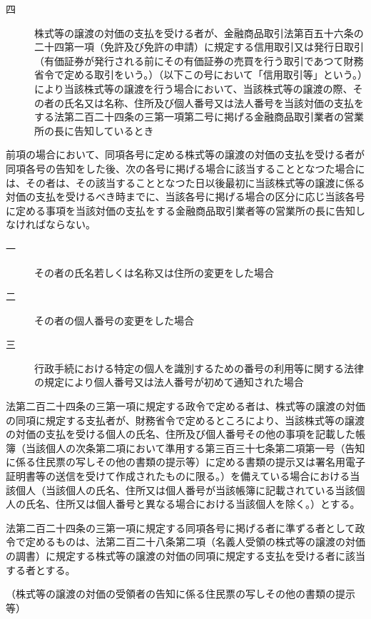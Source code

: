 \documentclass[twocolumn,a4j,10pt]{ltjtarticle}
\begin{document}
\begin{description}
\begin{description}
\item[四]株式等の譲渡の対価の支払を受ける者が、金融商品取引法第百五十六条の二十四第一項（免許及び免許の申請）に規定する信用取引又は発行日取引（有価証券が発行される前にその有価証券の売買を行う取引であつて財務省令で定める取引をいう。）（以下この号において「信用取引等」という。）により当該株式等の譲渡を行う場合において、当該株式等の譲渡の際、その者の氏名又は名称、住所及び個人番号又は法人番号を当該対価の支払をする法第二百二十四条の三第一項第二号に掲げる金融商品取引業者の営業所の長に告知しているとき
\end{description}
\item[\rensuji{3}]前項の場合において、同項各号に定める株式等の譲渡の対価の支払を受ける者が同項各号の告知をした後、次の各号に掲げる場合に該当することとなつた場合には、その者は、その該当することとなつた日以後最初に当該株式等の譲渡に係る対価の支払を受けるべき時までに、当該各号に掲げる場合の区分に応じ当該各号に定める事項を当該対価の支払をする金融商品取引業者等の営業所の長に告知しなければならない。
\begin{description}
\item[一]その者の氏名若しくは名称又は住所の変更をした場合
\item[二]その者の個人番号の変更をした場合
\item[三]行政手続における特定の個人を識別するための番号の利用等に関する法律の規定により個人番号又は法人番号が初めて通知された場合
\end{description}
\item[\rensuji{4}]法第二百二十四条の三第一項に規定する政令で定める者は、株式等の譲渡の対価の同項に規定する支払者が、財務省令で定めるところにより、当該株式等の譲渡の対価の支払を受ける個人の氏名、住所及び個人番号その他の事項を記載した帳簿（当該個人の次条第二項において準用する第三百三十七条第二項第一号（告知に係る住民票の写しその他の書類の提示等）に定める書類の提示又は署名用電子証明書等の送信を受けて作成されたものに限る。）を備えている場合における当該個人（当該個人の氏名、住所又は個人番号が当該帳簿に記載されている当該個人の氏名、住所又は個人番号と異なる場合における当該個人を除く。）とする。
\item[\rensuji{5}]法第二百二十四条の三第一項に規定する同項各号に掲げる者に準ずる者として政令で定めるものは、法第二百二十八条第二項（名義人受領の株式等の譲渡の対価の調書）に規定する株式等の譲渡の対価の同項に規定する支払を受ける者に該当する者とする。
\end{description}
\noindent\hspace{10pt}（株式等の譲渡の対価の受領者の告知に係る住民票の写しその他の書類の提示等）
\end{document}
